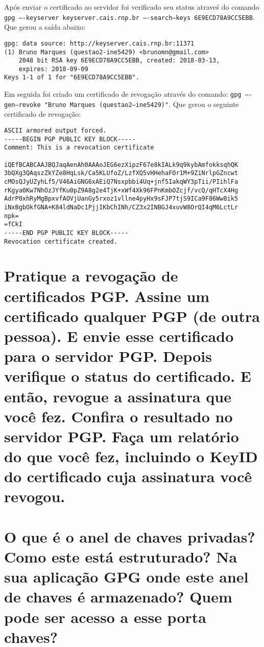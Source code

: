 \documentclass[
    article,            %
    11pt,               %
    oneside,            %
    a4paper,            %
    english,            %
    brazil,             %
    sumario=tradicional,
    ]{abntex2}
\begin{document}
Após enviar o certificado ao servidor foi verificado seu status atraveś do comando \texttt{gpg ----keyserver keyserver.cais.rnp.br ----search--keys 6E9ECD78A9CC5EBB}. Que gerou a saída abaixo:

\begin{Verbatim}[frame=single]
gpg: data source: http://keyserver.cais.rnp.br:11371
(1) Bruno Marques (questao2-ine5429) <brunomn@gmail.com>
    2048 bit RSA key 6E9ECD78A9CC5EBB, created: 2018-03-13, 
    expires: 2018-09-09
Keys 1-1 of 1 for "6E9ECD78A9CC5EBB".
\end{Verbatim}

Em seguida foi criado um certificado de revogação através do comando: \texttt{gpg ----gen--revoke "Bruno Marques (questao2--ine5429)"}. Que gerou o seguinte certificado de revogação:

\begin{Verbatim}[frame=single]
ASCII armored output forced.
-----BEGIN PGP PUBLIC KEY BLOCK-----
Comment: This is a revocation certificate

iQEfBCABCAAJBQJaqAenAh0AAAoJEG6ezXipzF67e8kIALk9q9kybAmfokksqhQK
3bQXg3QAqszZkYZe8HqLsk/Ca5KLUfoZ/LzfXQ5vHHehaFOr1M+9ZiNrlpGZncwt
cMOsQJyUZyhLf5/V46AiGNG6xAEiQ7Nsxpbbi4Uq+jnf5IakqWY3pTii/PIihlFa
rKgya0Kw7NhOzJYfKu0pZ9A8g2e4TjK+xWf4Xk96FPnKmbOZcjf/vcQ/qHTcX4Hg
AdrP0xhRyMgBpxvfAOVjUanGy5rxoz1vllne4pyHx9sFJP7tjS9ICa9F86Ww8ik5
iNxBgbOkfGNA+K84ldNaDc1PjjIKbChINh/CZ3x2INBGJ4xuvW8OrQI4qM6LctLr
npk=
=fCkI
-----END PGP PUBLIC KEY BLOCK-----
Revocation certificate created.
\end{Verbatim}


\section{Pratique a revogação de certificados PGP. Assine um certificado qualquer PGP (de outra pessoa). E envie esse certificado para o servidor PGP. Depois verifique o status do certificado. E então, revogue a assinatura que você fez. Confira o resultado no servidor PGP. Faça um relatório do que você fez, incluindo o KeyID do certificado cuja assinatura você revogou.}


\section{O que é o anel de chaves privadas? Como este está estruturado? Na sua aplicação GPG onde este anel de chaves é armazenado? Quem pode ser acesso a esse porta chaves?}
\end{document}
